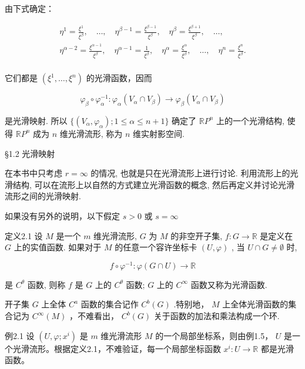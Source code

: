 由下式确定：

$$
\begin{array}{l} \eta^ {1} = \frac {\xi^ {1}}{\xi^ {\beta}}, \quad \dots , \quad \eta^ {\beta - 1} = \frac {\xi^ {\beta - 1}}{\xi^ {\beta}}, \quad \eta^ {\beta} = \frac {\xi^ {\beta + 1}}{\xi^ {\beta}}, \quad \dots , \\ \eta^ {\alpha - 2} = \frac {\xi^ {\alpha - 1}}{\xi^ {\beta}}, \quad \eta^ {\alpha - 1} = \frac {1}{\xi^ {\beta}}, \quad \eta^ {\alpha} = \frac {\xi^ {\alpha}}{\xi^ {\beta}}, \quad \dots , \quad \eta^ {n} = \frac {\xi^ {n}}{\xi^ {\beta}}. \\ \end{array}
$$

它们都是  $(\xi^{1},\dots ,\xi^{n})$  的光滑函数，因而

$$
\varphi_ {\beta} \circ \varphi_ {\alpha} ^ {- 1}: \varphi_ {\alpha} (V _ {\alpha} \cap V _ {\beta}) \rightarrow \varphi_ {\beta} (V _ {\alpha} \cap V _ {\beta})
$$

是光滑映射. 所以  $\{(V_{\alpha}, \varphi_{\alpha}); 1 \leqslant \alpha \leqslant n + 1\}$  确定了  $\mathbb{R}P^{n}$  上的一个光滑结构, 使得  $\mathbb{R}P^{n}$  成为  $n$  维光滑流形, 称为  $n$  维实射影空间.

 §1.2 光滑映射

在本书中只考虑  $r = \infty$  的情况, 也就是只在光滑流形上进行讨论. 利用流形上的光滑结构, 可以在流形上以自然的方式建立光滑函数的概念, 然后再定义并讨论光滑流形之间的光滑映射.

如果没有另外的说明，以下假定  $s > 0$  或  $s = \infty$

定义2.1 设  $M$  是一个  $m$  维光滑流形,  $G$  为  $M$  的非空开子集,  $f: G \to \mathbb{R}$  是定义在  $G$  上的实值函数. 如果对于  $M$  的任意一个容许坐标卡  $(U, \varphi)$ , 当  $U \cap G \neq \emptyset$  时,

$$
f \circ \varphi^ {- 1}: \varphi (G \cap U) \rightarrow \mathbb {R}
$$

是  $C^\theta$  函数, 则称  $f$  是  $G$  上的  $C^\theta$  函数;  $G$  上的  $C^\infty$  函数又称为光滑函数.

开子集  $G$  上全体  $C^a$  函数的集合记作  $C^b (G)$  .特别地，  $M$  上全体光滑函数的集合记为  $C^\infty (M)$  ，不难看出，  $C^b (G)$  关于函数的加法和乘法构成一个环.

例2.1 设  $(U, \varphi; x^i)$  是  $m$  维光滑流形  $M$  的一个局部坐标系，则由例1.5， $U$  是一个光滑流形。根据定义2.1，不难验证，每一个局部坐标函数  $x^i: U \to \mathbb{R}$  都是光滑函数。

